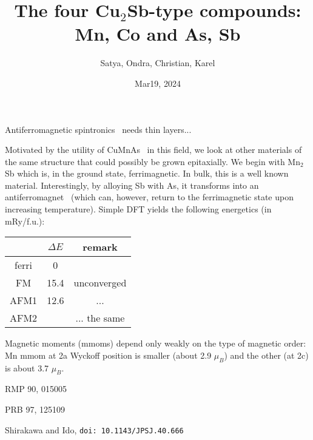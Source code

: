 \documentclass{article}
\title{The four Cu$_2$Sb-type compounds: Mn, Co and As, Sb}
\author{Satya, Ondra, Christian, Karel}
\date{Mar19, 2024}
\def\mn2sb{Mn$_2$Sb}
\begin{document}
\maketitle

Antiferromagnetic spintronics~\cite{Baltz:2018_a} needs thin layers...

Motivated by the utility of CuMnAs~\cite{Veis:2018_a} in this field,
we look at other materials of the same structure that could possibly
be grown epitaxially. We begin with \mn2sb which is, in the ground
state, ferrimagnetic. In bulk, this is a well known material.
Interestingly, by alloying Sb with As, it transforms into an
antiferromagnet~\cite{Shirakawa:1976_a} (which can, however, return to
the ferrimagnetic state upon increasing temperature). Simple DFT
yields the following energetics (in mRy/f.u.):

\begin{center}
  \begin{tabular}{c|cc}
    & $\Delta E$ & remark \\ \hline
    ferri & 0 \\
    FM    & 15.4 & unconverged \\
    AFM1  & 12.6 & ...\\
    AFM2  && ... the same
  \end{tabular}
\end{center}

Magnetic moments (mmoms) depend only weakly on the type of magnetic order: 
Mn mmom at 2a Wyckoff position is smaller (about 2.9 $\mu_B$) and the other
(at 2c) is about 3.7 $\mu_B$.

\begin{thebibliography}{99}

 RMP 90, 015005

 PRB 97, 125109

 Shirakawa and Ido,
  {\tt doi: 10.1143/JPSJ.40.666}
  
\end{thebibliography}
\end{document}
